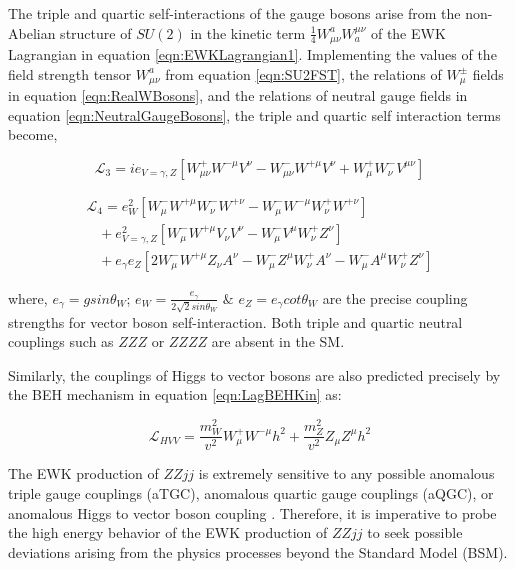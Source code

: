 The triple and quartic self-interactions of the gauge bosons arise from the non-Abelian structure of $SU(2)$ in the kinetic term $ \frac{1}{4} W^{a}_{\mu\nu} W^{\mu\nu}_{a}$ of the EWK Lagrangian in equation \ref{eqn:EWKLagrangian1}. Implementing the values of the field strength tensor $W^{a}_{\mu\nu}$ from equation \ref{eqn:SU2FST}, the relations of $W_{\mu}^{\pm}$ fields in equation \ref{eqn:RealWBosons}, and the relations of neutral gauge fields in equation \ref{eqn:NeutralGaugeBosons}, the triple and quartic self interaction terms become, 

\begin{equation}
\mathcal{L}_{3} = ie_{V=\gamma,Z} [ W^{+}_{\mu\nu} W^{-\mu} V^{\nu} - W^{-}_{\mu\nu} W^{+\mu} V^{\nu} + W_{\mu}^{+}W_{\nu}^{-}V^{\mu\nu} ] 
\label{eqn:L_TGC}
\end{equation}

\begin{equation}
\begin{array}{l}
\mathcal{L}_{4} = e^{2}_{W} [ W^{-}_{\mu}W^{+\mu}W^{-}_{\nu}W^{+\nu} - W^{-}_{\mu}W^{-\mu}W^{+}_{\nu}W^{+\nu} ] \\
 \hspace{10pt} + e^2_{V=\gamma,Z} [ W^{-}_{\mu}W^{+\mu}V_{\nu}V^{\nu} - W^{-}_{\mu}V^{\mu}W^{+}_{\nu}Z^{\nu} ] \\
  \hspace{10pt} + e_{\gamma}e_{Z} [ 2W^{-}_{\mu} W^{+\mu} Z_{\nu}A^{\nu} - W_{\mu}^{-}Z^{\mu}W^{+}_{\nu}A^{\nu} - W_{\mu}^{-}A^{\mu}W^{+}_{\nu}Z^{\nu} ]
\end{array}
\label{eqn:L_QGC}
\end{equation}

where, $e_{\gamma} = gsin\theta_{W}$; $e_{W} = \frac{e_{\gamma}}{2\sqrt{2}sin\theta_{W}}$ $\&$ $e_{Z} = e_{\gamma}cot\theta_{W}$ are the precise coupling strengths for vector boson self-interaction. Both triple and quartic neutral couplings such as $ZZZ$ or $ZZZZ$ are absent in the SM. 

Similarly, the couplings of Higgs to vector bosons are also predicted precisely by the BEH mechanism in equation \ref{eqn:LagBEHKin} as:

\begin{equation}
\mathcal{L}_{HVV} = \frac{m_{W}^2}{v^2} W^{+}_{\mu}W^{-\mu}h^{2} + \frac{m_{Z}^{2}}{v^2} Z_{\mu}Z^{\mu}h^{2}
\label{eqn:HVVCoupling}
\end{equation}

The EWK production of $ZZjj$ is extremely sensitive to any possible anomalous triple gauge couplings (aTGC), anomalous quartic gauge couplings (aQGC), or anomalous Higgs to vector boson coupling \cite{SensitivityNP} \cite{EboliModelaQGC} \cite{BSM_Simple2HDM} . Therefore, it is imperative to probe the high energy behavior of the EWK production of $ZZjj$ to seek possible deviations arising from the physics processes beyond the Standard Model (BSM). 

